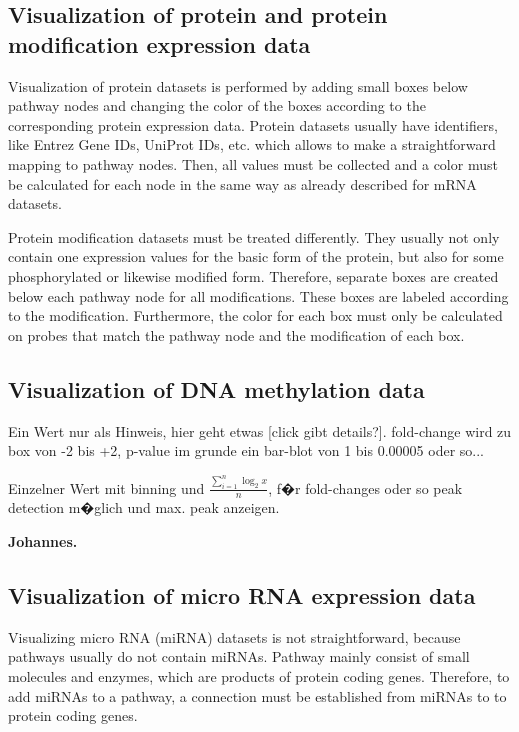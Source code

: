 \documentclass{bioinfo}
\begin{document}
\subsection{Visualization of protein and protein modification expression data}

Visualization of protein datasets is performed by adding small boxes below pathway nodes and
changing the color of the boxes according to the corresponding protein expression data. Protein
datasets usually have identifiers, like Entrez Gene IDs, UniProt IDs, etc. which allows to make a
straightforward mapping to pathway nodes. Then, all values must be collected and a color must be
calculated for each node in the same way as already described for mRNA datasets.

Protein modification datasets must be treated differently. They usually not only contain one
expression values for the basic form of the protein, but also for some phosphorylated or likewise
modified form. Therefore, separate boxes are created below each pathway node for all
modifications. These boxes are labeled according to the modification. Furthermore, the color for
each box must only be calculated on probes that match the pathway node and the modification of each
box.

\subsection{Visualization of DNA methylation data}

Ein Wert nur als Hinweis, hier geht etwas [click gibt details?]. fold-change wird zu box von -2 bis
+2, p-value im grunde ein bar-blot von 1 bis 0.00005 oder so...

Einzelner Wert mit binning und $\frac{\sum\limits_{i=1}^n\log_2 x}{n}$, f�r fold-changes oder so
peak detection m�glich und max. peak anzeigen.

\textbf{Johannes.}


\subsection{Visualization of micro RNA expression data}

Visualizing micro RNA (miRNA) datasets is not straightforward, because pathways usually do not
contain miRNAs. Pathway mainly consist of small molecules and enzymes, which are products of protein
coding genes. Therefore, to add miRNAs to a pathway, a connection must be established from miRNAs to
to protein coding genes.
\end{document}
